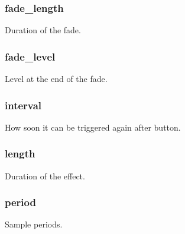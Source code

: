 \subsubsection[{\texorpdfstring{fade\+\_\+length}{fade_length}}]{ fade\+\_\+length}\hypertarget{struct_s_d_l___haptic_custom_a576ff5ee847dd20a8f1c4a69ce09ba79}{}\label{struct_s_d_l___haptic_custom_a576ff5ee847dd20a8f1c4a69ce09ba79}
Duration of the fade. 
\subsubsection[{\texorpdfstring{fade\+\_\+level}{fade_level}}]{ fade\+\_\+level}\hypertarget{struct_s_d_l___haptic_custom_a03b48c5ffd631a0f35741e1aa7f482dd}{}\label{struct_s_d_l___haptic_custom_a03b48c5ffd631a0f35741e1aa7f482dd}
Level at the end of the fade. 
\subsubsection[{\texorpdfstring{interval}{interval}}]{ interval}\hypertarget{struct_s_d_l___haptic_custom_a263a60513b1bdb1e91b28bd2e128e9d4}{}\label{struct_s_d_l___haptic_custom_a263a60513b1bdb1e91b28bd2e128e9d4}
How soon it can be triggered again after button. 
\subsubsection[{\texorpdfstring{length}{length}}]{ length}\hypertarget{struct_s_d_l___haptic_custom_afbde362d49894774c8b9c9e85ac0a913}{}\label{struct_s_d_l___haptic_custom_afbde362d49894774c8b9c9e85ac0a913}
Duration of the effect. 
\subsubsection[{\texorpdfstring{period}{period}}]{ period}\hypertarget{struct_s_d_l___haptic_custom_aacbf2f8754962f2848ff53502e42e64b}{}\label{struct_s_d_l___haptic_custom_aacbf2f8754962f2848ff53502e42e64b}
Sample periods. 
